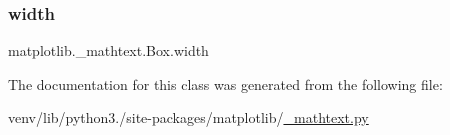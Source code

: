 \subsubsection{\texorpdfstring{width}{width}}
{\footnotesize\ttfamily matplotlib.\+\_\+mathtext.\+Box.\+width}



The documentation for this class was generated from the following file\+:\begin{DoxyCompactItemize}
\item 
venv/lib/python3./site-\/packages/matplotlib/\hyperlink{__mathtext_8py}{\+\_\+mathtext.\+py}\end{DoxyCompactItemize}
